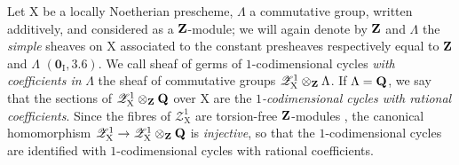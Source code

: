 \begin{env}[21.10.9]
\label{IV.21.10.9}
Let $\mathrm{X}$ be a locally Noetherian prescheme, $\Lambda$ a commutative group, written additively, and considered as a $\mathbf{Z}$-module; we will again denote by $\mathbf{Z}$ and $\Lambda$ the \emph{simple} sheaves on $\mathrm{X}$ associated to the constant presheaves respectively equal to $\mathbf{Z}$ and $\Lambda$ $(\mathbf{0}_{\mathrm{I}},3.6)$.
We call sheaf of germs of $1$-codimensional cycles \emph{with coefficients in} $\Lambda$ the sheaf of commutative groups $\mathscr{Z}^1_{\mathrm{X}}\otimes_{\mathbf{Z}}\Lambda$.
If $\Lambda=\mathbf{Q}$, we say that the sections
of $\mathscr{Z}^1_{\mathrm{X}}\otimes_{\mathbf{Z}}\mathbf{Q}$ over $\mathrm{X}$ are the \emph{$1$-codimensional cycles with rational coefficients}.
Since the fibres of $\mathscr{Z}^1_{\mathrm{X}}$ are torsion-free $\mathbf{Z}$-modules , the canonical homomorphism $\mathscr{Z}^1_{\mathrm{X}}\to\mathscr{Z}^1_{\mathrm{X}}\otimes_{\mathbf{Z}}\mathbf{Q}$ is \emph{injective}, so that the $1$-codimensional cycles are identified with $1$-codimensional cycles with rational coefficients.
\end{env}

